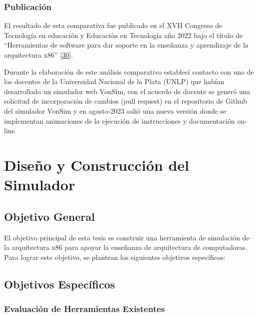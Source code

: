 \documentclass[12pt,twoside]{templates/unerthesis}
\begin{document}
\hypertarget{publicaciuxf3n}{%
\subsection{Publicación}\label{publicaciuxf3n}}

El resultado de esta comparativa fue publicado en el XVII Congreso de Tecnología en educación y Educación en Tecnología año 2022 bajo el título de ``Herramientas de software para dar soporte en la enseñanza y aprendizaje de la arquitectura x86'' {[}\protect\hyperlink{ref-colombani_herramientas_2022}{30}{]}.

Durante la elaboración de este análisis comparativo establecí contacto con uno de los docentes de la Universidad Nacional de la Plata (UNLP) que habían desarrollado un simulador web VonSim, con el acuerdo de docente se generó una solicitud de incorporación de cambios (pull request) en el repositorio de Github del simulador VonSim y en agosto-2023 salió una nueva versión donde se implementan animaciones de la ejecución de instrucciones y documentación on-line.

\hypertarget{diseuxf1o-y-construcciuxf3n-del-simulador}{%
\chapter{Diseño y Construcción del Simulador}\label{diseuxf1o-y-construcciuxf3n-del-simulador}}

\hypertarget{objetivo-general}{%
\section{Objetivo General}\label{objetivo-general}}

El objetivo principal de esta tesis es construir una herramienta de simulación de la arquitectura x86 para apoyar la enseñanza de arquitectura de computadoras. Para lograr este objetivo, se plantean los siguientes objetivos específicos:

\hypertarget{objetivos-especuxedficos}{%
\section{Objetivos Específicos}\label{objetivos-especuxedficos}}

\hypertarget{evaluaciuxf3n-de-herramientas-existentes}{%
\subsection{Evaluación de Herramientas Existentes}\label{evaluaciuxf3n-de-herramientas-existentes}}
\end{document}
